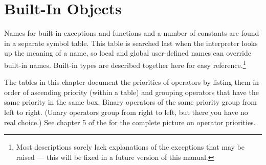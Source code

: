 \chapter{Built-In Objects \label{builtin}}

Names for built-in exceptions and functions and a number of constants are
found in a separate 
symbol table.  This table is searched last when the interpreter looks
up the meaning of a name, so local and global
user-defined names can override built-in names.  Built-in types are
described together here for easy reference.\footnote{
	Most descriptions sorely lack explanations of the exceptions
	that may be raised --- this will be fixed in a future version of
	this manual.}

The tables in this chapter document the priorities of operators by
listing them in order of ascending priority (within a table) and
grouping operators that have the same priority in the same box.
Binary operators of the same priority group from left to right.
(Unary operators group from right to left, but there you have no real
choice.)  See chapter 5 of the  for the complete picture on operator priorities.
